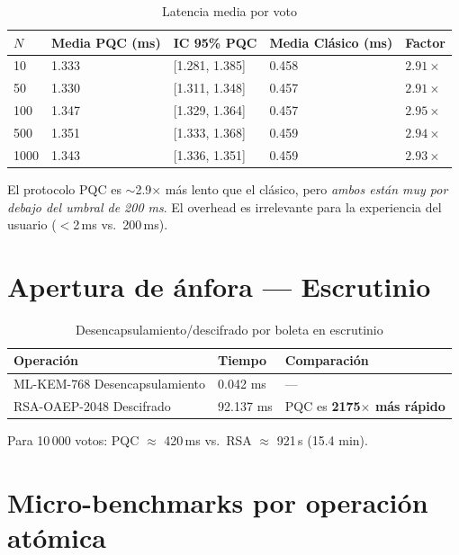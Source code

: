 \documentclass[12pt,a4paper,twoside,openright]{book}
\theoremstyle{plain}
\theoremstyle{definition}
\theoremstyle{remark}
\begin{document}
\begin{table}[H]
\centering
\caption{Latencia media por voto}
\label{tab:latencia}
\begin{tabular}{lllll}
\toprule
$N$ & Media PQC (ms) & IC 95\% PQC & Media Cl\'asico (ms) & Factor \\
\midrule
10   & 1.333 & [1.281, 1.385] & 0.458 & $2.91\times$ \\
50   & 1.330 & [1.311, 1.348] & 0.457 & $2.91\times$ \\
100  & 1.347 & [1.329, 1.364] & 0.457 & $2.95\times$ \\
500  & 1.351 & [1.333, 1.368] & 0.459 & $2.94\times$ \\
1000 & 1.343 & [1.336, 1.351] & 0.459 & $2.93\times$ \\
\bottomrule
\end{tabular}
\end{table}

\begin{minota}[Interpretaci\'on]
  El protocolo PQC es $\sim$2.9$\times$ m\'as lento que el cl\'asico, pero
  \emph{ambos est\'an muy por debajo del umbral de 200 ms}. El overhead es
  irrelevante para la experiencia del usuario ($<$2\,ms vs.\ 200\,ms).
\end{minota}

\section{Apertura de \'anfora --- Escrutinio}

\begin{table}[H]
\centering
\caption{Desencapsulamiento/descifrado por boleta en escrutinio}
\label{tab:anfora}
\begin{tabular}{lll}
\toprule
\textbf{Operaci\'on} & \textbf{Tiempo} & \textbf{Comparaci\'on} \\
\midrule
ML-KEM-768 Desencapsulamiento & 0.042 ms & --- \\
RSA-OAEP-2048 Descifrado & 92.137 ms & PQC es \textbf{2175$\times$ m\'as r\'apido} \\
\bottomrule
\end{tabular}
\end{table}

Para 10\,000 votos: PQC $\approx$ 420\,ms vs.\ RSA $\approx$ 921\,s (15.4 min).

\section{Micro-benchmarks por operaci\'on at\'omica}
\end{document}
